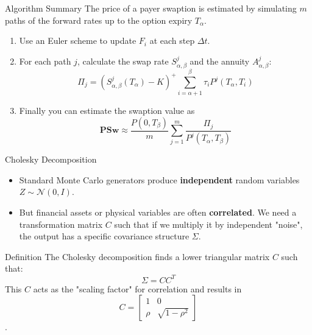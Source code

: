 \documentclass{beamer}
\begin{document}
\begin{frame}{Algorithm Summary}
	The price of a payer swaption is estimated by simulating $m$ paths of the forward rates up to the option expiry $T_\alpha$.
	
	\begin{enumerate}
		\item Use an Euler scheme to update $F_i$ at each step $\Delta t$.
		\item For each path $j$, calculate the swap rate $S_{\alpha,\beta}^j$ and the annuity $A_{\alpha,\beta}^j$:
		\[ \Pi_j = (S_{\alpha,\beta}^j(T_\alpha) - K)^+ \sum_{i=\alpha+1}^\beta \tau_i P^j(T_\alpha, T_i) \]
		\item Finally you can estimate the swaption value as
		\begin{equation*}
			\mathbf{PSw} \approx \frac{P(0, T_\beta)}{m} \sum_{j=1}^m \frac{\Pi_j}{P^j(T_\alpha, T_\beta)}
		\end{equation*}
	\end{enumerate}
\end{frame}


\begin{frame}{Cholesky Decomposition }
	\begin{itemize}
		\item Standard Monte Carlo generators produce \textbf{independent} random variables $Z \sim \mathcal{N}(0, I)$.
		\item But financial assets or physical variables are often \textbf{correlated}. We need a transformation matrix $C$ such that if we multiply it by independent "noise", the output has a specific covariance structure $\Sigma$.
	\end{itemize}
	
	\begin{block}{Definition}
		The Cholesky decomposition finds a lower triangular matrix $C$ such that:
		$$\Sigma = CC^T$$
		This $C$ acts as the "scaling factor" for correlation and results in
		\begin{equation*}
			C = \begin{bmatrix}
				1 & 0 \\
				\rho & \sqrt{1-\rho^2}
			\end{bmatrix}
		\end{equation*}.
	\end{block}
\end{frame}
\end{document}
